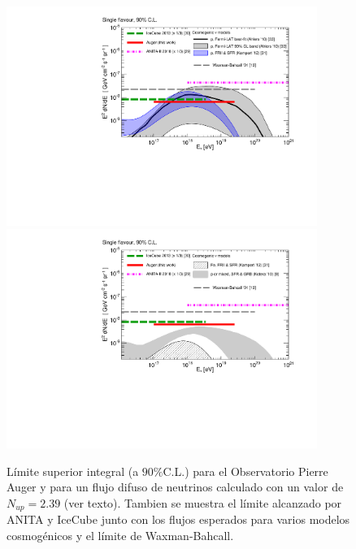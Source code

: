 	\begin{figure}[ht!]
		\begin{center}
			\includegraphics[width=0.9\textwidth]{fig/resultadosAuger/integral_limits_and_models_paper_combined_proton}\\
			\includegraphics[width=0.9\textwidth]{fig/resultadosAuger/integral_limits_and_models_paper_combined_heavy}
			\caption{\label{fig:intLimits}
			L\'imite superior integral (a $90\%$C.L.) para el Observatorio Pierre Auger y para un flujo difuso de neutrinos calculado con un valor de $N_{up}=2.39$ (ver texto).
			Tambien se muestra el l\'imite alcanzado por ANITA\cite{cite:Anita2} y IceCube\cite{cite:IceCubePev} junto con los flujos esperados para varios modelos cosmog\'enicos\cite{Kampert_GZK,Ahlers_GZK,Kotera_GZK,Becker_AGN} y el l\'imite de Waxman-Bahcall\cite{cite:nuGRB}.}
		\end{center}
	\end{figure}
	
